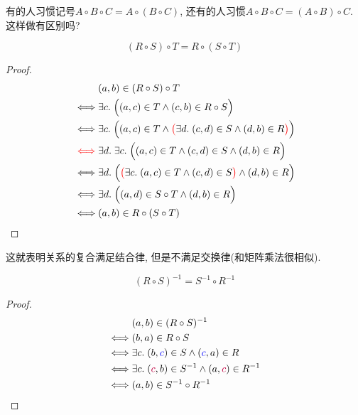 \begin{bonus}
  有的人习惯记号$A\circ B\circ C=A\circ (B\circ C)$, 还有的人习惯$A\circ B\circ C=(A\circ B)\circ C$. 这样做有区别吗?  
\end{bonus}
\begin{theorem}
  \[
    (R \circ S) \circ T = R \circ (S \circ T)
  \]
\end{theorem}
\begin{proof}
  \setcounter{equation}{0}
  \begin{align*}
    &(a, b) \in (R \circ S) \circ T \\
    \iff& \exists c.\; \Big((a, c) \in T \land (c, b) \in R \circ S\Big) \\
    \iff& \exists c.\; \Big((a, c) \in T \land \textcolor{red}{\big(}\exists d.\; (c, d) \in S \land (d, b) \in R\textcolor{red}{\big)}\Big) \\
    \textcolor{red}{\iff}& \exists d.\; \exists c.\; \Big((a, c) \in T \land (c, d) \in S \land (d, b) \in R\Big) \\
    \iff& \exists d.\; \Big(\textcolor{red}{\big(}\exists c.\; (a, c) \in T \land (c, d) \in S\textcolor{red}{\big)} \land (d, b) \in R\Big) \\
    \iff& \exists d.\; \Big((a, d) \in S \circ T \land (d, b) \in R\Big) \\
    \iff& (a, b) \in R \circ (S \circ T)
  \end{align*} 
\end{proof}

这就表明关系的复合满足结合律, 但是不满足交换律(和矩阵乘法很相似). 


\begin{theorem}
  \[
    (R \circ S)^{-1} = S^{-1} \circ R^{-1} 
  \]
\end{theorem}

\begin{proof}
  \setcounter{equation}{0}
  \begin{align*}
    &(a, b) \in (R \circ S)^{-1} \\
    \iff& (b, a) \in R \circ S \\
    \iff& \exists c.\; (b, \textcolor{blue}{c}) \in S \land (\textcolor{blue}{c}, a) \in R \\
    \iff& \exists c.\; (\textcolor{purple}{c}, b) \in S^{-1} \land (a, \textcolor{purple}{c}) \in R^{-1} \\
    \iff& (a, b) \in S^{-1} \circ R^{-1}
  \end{align*}
\end{proof}



